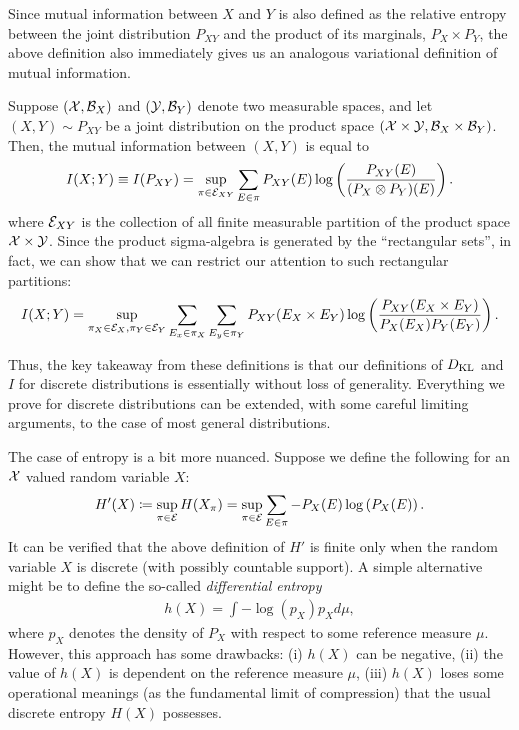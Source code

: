 \documentclass[12pt]{article}
\begin{document}
Since mutual information between $X$ and $Y$ is also defined as the relative entropy between the joint distribution $P_{XY}$ and the product of its marginals, $P_X \times P_Y$, the above definition also immediately gives us an analogous variational definition of mutual information. \begin{definition}
\label{def:mutual-information-general}   Suppose $({\cal X}, {\cal B}_X)$ and $({\cal Y}, {\cal B}_Y)$ denote two measurable spaces, and let $(X, Y) \sim P_{XY}$ be a joint distribution on the product space $({\cal X} \times {\cal Y}, {\cal B}_X \times {\cal B}_Y)$. Then, the mutual information between $(X, Y)$ is equal to 
\begin{align}
I(X;Y) \equiv I(P_{XY}) = \sup_{\pi \in {\cal E}_{XY}} \sum_{E \in \pi} P_{XY}(E) \log \left( \frac{P_{XY}(E)}{ (P_X \otimes P_Y)(E)}\right). 
\end{align}
where ${\cal E}_{XY}$ is the collection of all finite measurable partition of the product space ${\cal X} \times {\cal Y}$. Since the product sigma-algebra is generated by the ``rectangular sets'', in fact, we can show that we can restrict our attention to such rectangular partitions: 
\begin{align}
I(X; Y) = \sup_{\pi_X \in {\cal E}_X, \pi_Y \in  {\cal E}_Y} \sum_{E_x \in \pi_X} \sum_{E_y \in \pi_Y} P_{XY}(E_X \times E_Y) \log \left( \frac{P_{XY}(E_X \times E_Y)}{P_X(E_X) P_Y(E_Y)} \right). 
\end{align}
\end{definition}
Thus, the key takeaway from these definitions is that our definitions of $D_{\text{KL}}$ and $I$ for discrete distributions is essentially without loss of generality. Everything we prove for discrete distributions can be extended, with some careful limiting arguments, to the case of most general distributions. 

The case of entropy is a bit more nuanced. Suppose we define the following for an ${\cal X}$ valued random variable $X$: 
\begin{align}
H'(X) \coloneqq \sup_{\pi \in {\cal E}} H(X_\pi) = \sup_{\pi \in {\cal E}}   \sum_{E\in \pi}-P_X(E) \log \left( P_X(E) \right). 
\end{align}
It can be verified that the above definition of $H'$ is finite only when the random variable $X$ is discrete (with possibly countable support).   A simple alternative might be to define the so-called \emph{differential entropy} 
\begin{align}
h(X) = \int -\log(p_X) p_X d\mu, 
\end{align}
where $p_X$ denotes the density of $P_X$ with respect to some reference measure $\mu$. However, this approach has some drawbacks: (i) $h(X)$ can be negative, (ii) the value of $h(X)$ is dependent on the reference measure $\mu$, (iii) $h(X)$ loses some operational meanings (as the fundamental limit of compression) that the usual discrete entropy $H(X)$ possesses. 
\end{document}
